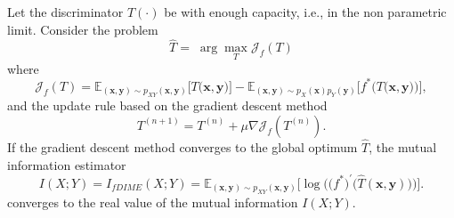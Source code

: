 \begin{lemma}
Let the discriminator $T(\cdot)$ be with enough capacity, i.e., in the non parametric limit. Consider the problem
\begin{equation}
\hat{T} =  \; \arg \max_T \mathcal{J}_{f}(T)
\end{equation}
where
\begin{equation}
\mathcal{J}_{f}(T) = \mathbb{E}_{(\mathbf{x},\mathbf{y}) \sim p_{XY}(\mathbf{x},\mathbf{y})}\biggl[T\bigl(\mathbf{x},\mathbf{y}\bigr)\biggr] -\mathbb{E}_{(\mathbf{x},\mathbf{y}) \sim p_{X}(\mathbf{x})p_{Y}(\mathbf{y})}\biggl[f^*\biggl(T\bigl(\mathbf{x},\mathbf{y}\bigr)\biggr)\biggr],
\end{equation}
and the update rule based on the gradient descent method
\begin{equation}
T^{(n+1)} = T^{(n)} + \mu \nabla \mathcal{J}_{f}(T^{(n)}).
\end{equation}
If the gradient descent method converges to the global optimum $\hat{T}$, the mutual information estimator 
\begin{equation}
I(X;Y) = I_{fDIME}(X;Y) =  \mathbb{E}_{(\mathbf{x},\mathbf{y}) \sim p_{XY}(\mathbf{x},\mathbf{y})}\biggl[ \log \biggl(\bigl(f^{*}\bigr)^{\prime}\bigl(\hat{T}(\mathbf{x},\mathbf{y})\bigr) \biggr) \biggr].
\end{equation}
converges to the real value of the mutual information $I(X;Y)$.
\end{lemma}

